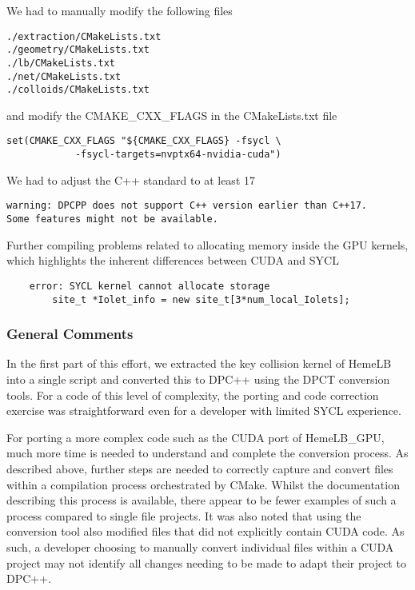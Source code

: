 \documentclass[../main]{subfiles}
\begin{document}
We had to manually modify the following files
\begin{footnotesize}
	\begin{verbatim}
./extraction/CMakeLists.txt
./geometry/CMakeLists.txt
./lb/CMakeLists.txt
./net/CMakeLists.txt
./colloids/CMakeLists.txt
\end{verbatim}
\end{footnotesize}
and modify the CMAKE\_CXX\_FLAGS in the CMakeLists.txt file
\begin{verbatim}
set(CMAKE_CXX_FLAGS "${CMAKE_CXX_FLAGS} -fsycl \
            -fsycl-targets=nvptx64-nvidia-cuda")
\end{verbatim}

We had to adjust the C++ standard to at least 17
\begin{verbatim}
warning: DPCPP does not support C++ version earlier than C++17.
Some features might not be available.
\end{verbatim}

Further compiling problems related to allocating memory inside the GPU kernels, which highlights the inherent differences between CUDA and SYCL
\begin{verbatim}
    error: SYCL kernel cannot allocate storage
        site_t *Iolet_info = new site_t[3*num_local_Iolets];
\end{verbatim}


\subsubsection{General Comments}
In the first part of this effort, we extracted the key collision kernel of HemeLB into a single script and converted this to DPC++ using the  DPCT conversion tools.
For a code of this level of complexity, the porting and code correction exercise was straightforward even for a developer with limited SYCL experience.

For porting a more complex code such as the CUDA port of HemeLB\_GPU, much more time is needed to understand and complete the conversion process.
As described above, further steps are needed to correctly capture and convert files within a compilation process orchestrated by CMake.
Whilst the documentation describing this process is available, there appear to be fewer examples of such a process compared to single file projects.
It was also noted that using the conversion tool also modified files that did not explicitly contain CUDA code.
As such, a developer choosing to manually convert individual files within a CUDA project may not identify all changes needing to be made to adapt their project to DPC++.
\end{document}
